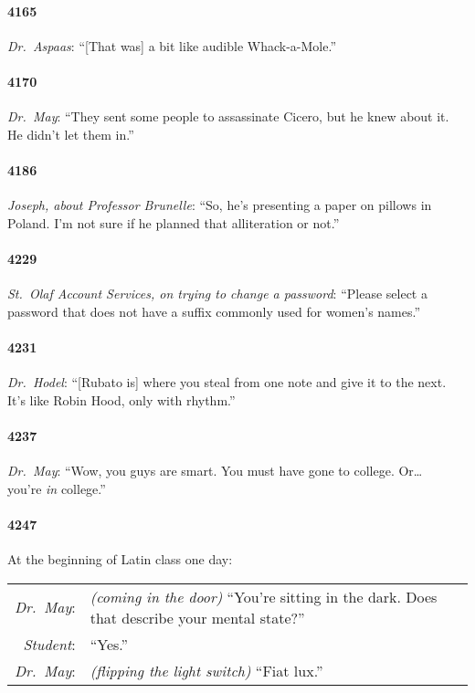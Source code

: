 \documentclass[10pt]{memoir}
\newcommand{\speakertag}[1]{\emph{#1}: }
\newcommand{\st}{\speakertag}
\newcommand{\intro}[1]{\emph{#1}}
\begin{document}
\paragraph{4165} \intro{Dr.\ Aspaas}: ``[That was] a bit like audible Whack-a-Mole.''

\paragraph{4170} \intro{Dr.\ May}: ``They sent some people to assassinate Cicero, but he knew about it. He didn't let them in.''

\paragraph{4186} \intro{Joseph, about Professor Brunelle}: ``So, he's presenting a paper on pillows in Poland. I'm not sure if he planned that alliteration or not.''

\paragraph{4229} \intro{St.\ Olaf Account Services, on trying to change a password}: ``Please select a password that does not have a suffix commonly used for women's names.''

\paragraph{4231} \intro{Dr.\ Hodel}: ``[Rubato is] where you steal from one note and give it to the next. It's like Robin Hood, only with rhythm.''

\paragraph{4237} \intro{Dr.\ May}: ``Wow, you guys are smart. You must have gone to college. Or\ldots\\ you're \emph{in} college.''

\paragraph{4247} At the beginning of Latin class one day:\\

\noindent \begin{tabularx}{\textwidth}{r X}
\st{Dr.\ May} & \emph{(coming in the door)} ``You're sitting in the dark. Does that describe your mental state?''\\
\st{Student} & ``Yes.''\\
\st{Dr.\ May} & \emph{(flipping the light switch)} ``Fiat lux.''\thinspace\footnotemark
\end{tabularx}
\end{document}
